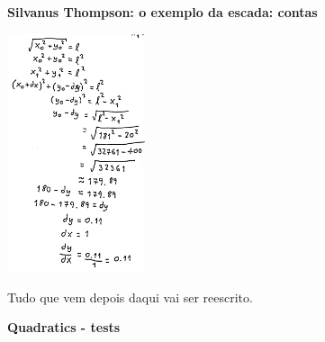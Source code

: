 \documentclass[oneside,12pt]{article}
\begin{document}
\newpage

{\bf Silvanus Thompson: o exemplo da escada: contas}

\msk

\includegraphics[height=7.0cm]{2021-1-C3/20210806_silvanus_escada_contas.pdf}

\newpage


Tudo que vem depois daqui vai ser reescrito.

\newpage


{\bf Quadratics - tests}




\pu

\def\QuadraticInPerspective#1{
   \beginpicture(0,-3)(10,6)
     \pictgray{\expr{v3():xygrid(4,3)          }}
     \expr          {v3():axeswithticks(4,3,3) }
     \expr          {#1:diagonals(8, "c")      }
     \expr          {#1:square   (8, "0")      }
     \pictgray{\expr{#1:square   (2, "p")      }}
     \expr          {#1:square   (8, "c")      }
   \end{picture}}
\end{document}

